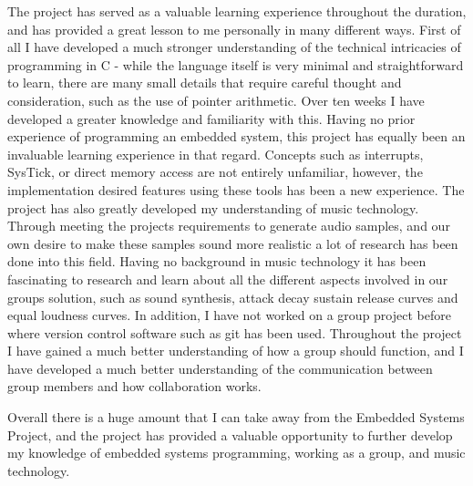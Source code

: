 The project has served as a valuable learning experience throughout the duration, 
and has provided a great lesson to me personally in many different ways. 
First of all I have developed a much stronger understanding of the technical 
intricacies of programming in C - while the language itself is very minimal and 
straightforward to learn, there are many small details that require careful 
thought and consideration, such as the use of pointer arithmetic. Over ten weeks 
I have developed a greater knowledge and familiarity with this. 
Having no prior experience of programming an embedded system, this project has 
equally been an invaluable learning experience in that regard. 
Concepts such as interrupts, SysTick, or direct memory access are not entirely 
unfamiliar, however, the implementation desired features using these tools has 
been a new experience.
The project has also greatly developed my understanding of music technology. 
Through meeting the projects requirements to generate audio samples, and our own 
desire to make these samples sound more realistic a lot of research has been done 
into this field. 
Having no background in music technology it has been fascinating to research and 
learn about all the different aspects involved in our groups solution, such as 
sound synthesis, attack decay sustain release curves and equal loudness curves.
In addition, I have not worked on a group project before where version control 
software such as git has been used. Throughout the project I have gained a much 
better understanding of how a group should function, and I have developed a much 
better understanding of the communication between group members and how 
collaboration works. 
\par\bigskip\noindent
Overall there is a huge amount that I can take away from the Embedded Systems 
Project, and the project has provided a valuable opportunity to further develop 
my knowledge of embedded systems programming, working as a group, and music 
technology. 
